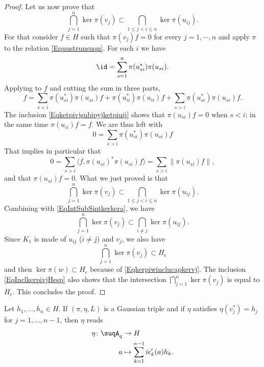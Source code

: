 \begin{proof}
	Let us now prove that
	\begin{equation}
		\bigcap_{j=1}^n\ker\pi(v_j)\subset\bigcap_{1\leq j<i\leq n}\ker\pi(u_{ij}).
	\end{equation}
	For that consider $f\in H$ such that $\pi(v_j)f=0$ for every $j=1,\cdots,n$ and apply $\pi$ to the relation \eqref{Equustrunsuqn}. For each $i$ we have
	\begin{equation}
		\id=\sum_{s=1}^n\pi(u_{si}^*)\pi(u_{si}).
	\end{equation}
	Applying to $f$ and cutting the sum in three parts,
	\begin{equation}
		f=\sum_{s<i}\pi(u_{si}^*)\pi(u_{si})f+\pi(u_{ii}^*)\pi(u_{ii})f+\sum_{s>i}\pi(u_{si}^*)\pi(u_{si})f.
	\end{equation}
	The inclusion \eqref{Eqketpivjsubipyjketpiuij} shows that $\pi(u_{si})f=0$ when $s<i$; in the same time $\pi(u_{ii})f=f$. We are thus left with
	\begin{equation}
		0=\sum_{s>i}\pi(u_{si}^*)\pi(u_{si})f
	\end{equation}
	That implies in particular that
	\begin{equation}
		0=\sum_{s>i}\langle f, \pi(u_{si})^*\pi(u_{si})f\rangle =\sum_{s>i}\| \pi(u_{si})f \|,
	\end{equation}
	and that $\pi(u_{si})f=0$. What we just proved is that
	\begin{equation}
		\bigcap_{j=1}^n\ker\pi(v_j)\subset\bigcap_{1\leq j<i\leq n}\ker\pi(u_{ij}).
	\end{equation}
	Combining with \eqref{EqIntSubSintkerkera}, we have
	\begin{equation}
		\bigcap_{j=1}^n\ker\pi(v_j)\subset\bigcap_{i\neq j}\ker\pi(u_{ij}).
	\end{equation}
	Since $K_1$ is made of $u_{ij}$ ($i\neq j$) and $v_j$, we also have
	\begin{equation}        \label{EqInclkerpivjHesp}
		\bigcap_{j=1}^n\ker\pi(v_j)\subset H_{\epsilon}
	\end{equation}
	and then $\ker \pi(w)\subset H_{\epsilon}$ because of \eqref{Eqkerpiwinclucapkervj}. The inclusion \eqref{EqInclkerpivjHesp} also shows that the intersection $\bigcap_{j=1}^n\ker\pi(v_j)$ is equal to $H_{\epsilon}$. This concludes the proof.
\end{proof}

\begin{proposition}
	Let $h_1,\ldots,h_n\in H$. If $(\pi,\eta,L)$ is a Gaussian triple and if $\eta$ satisfies $\eta(v_j^*)=h_j$ for $j=1,\ldots,n-1$, then $\eta$ reads
	\begin{equation}        \label{EqDefEtaCocyGaussU}
		\begin{aligned}
			\eta\colon \suqA_q & \to H                                       \\
			a                  & \mapsto \sum_{k=1}^{n-1}i\epsilon_k'(a)h_k.
		\end{aligned}
	\end{equation}
\end{proposition}

